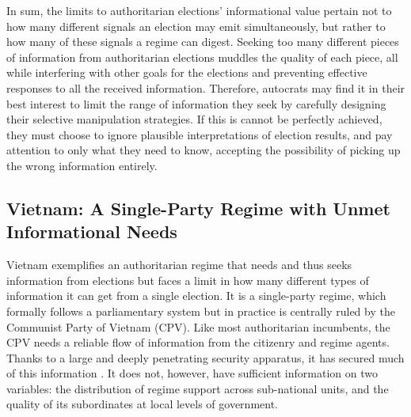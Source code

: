 \documentclass[12pt]{article}
\newcommand{\1}{\mathbbm{1}}
\begin{document}
In sum, the limits to authoritarian elections' informational value pertain not to how many different signals an election may emit simultaneously, but rather to how many of these signals a regime can digest. Seeking too many different pieces of information from authoritarian elections muddles the quality of each piece, all while interfering with other goals for the elections and preventing effective responses to all the received information. Therefore, autocrats may find it in their best interest to limit the range of information they seek by carefully designing their selective manipulation strategies. If this is cannot be perfectly achieved, they must choose to ignore plausible interpretations of election results, and pay attention to only what they need to know, accepting the possibility of picking up the wrong information entirely.



\subsection*{Vietnam: A Single-Party Regime with Unmet Informational Needs}
\label{sec:vietnam_elections}
Vietnam exemplifies an authoritarian regime that needs and thus seeks information from elections but faces a limit in how many different types of information it can get from a single election. It is a single-party regime, which formally follows a parliamentary system but in practice is centrally ruled by the Communist Party of Vietnam (CPV). Like most authoritarian incumbents, the CPV needs a reliable flow of information from the citizenry and regime agents. Thanks to a large and deeply penetrating security apparatus, it has secured much of this information \citep{Thayer2014}. It does not, however, have sufficient information on two variables: the distribution of regime support across sub-national units, and the quality of its subordinates at local levels of government. 
\end{document}
